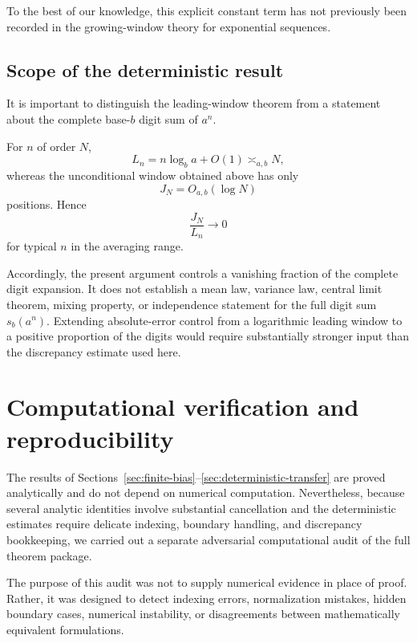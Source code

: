 \documentclass[11pt]{article}
\theoremstyle{definition}
\theoremstyle{remark}
\begin{document}
To the best of our knowledge, this explicit constant term has not
previously been recorded in the growing-window theory for exponential
sequences.


\subsection{Scope of the deterministic result}
\label{subsec:deterministic-scope}

It is important to distinguish the leading-window theorem from a
statement about the complete base-\(b\) digit sum of \(a^n\).

For \(n\) of order \(N\),
\[
    L_n
    =
    n\log_ba+O(1)
    \asymp_{a,b}N,
\]
whereas the unconditional window obtained above has only
\[
    J_N=O_{a,b}(\log N)
\]
positions.
Hence
\[
    \frac{J_N}{L_n}\longrightarrow0
\]
for typical \(n\) in the averaging range.

Accordingly, the present argument controls a vanishing fraction of the
complete digit expansion.  It does not establish a mean law, variance
law, central limit theorem, mixing property, or independence statement
for the full digit sum \(s_b(a^n)\).  Extending absolute-error control
from a logarithmic leading window to a positive proportion of the
digits would require substantially stronger input than the discrepancy
estimate used here.


\section{Computational verification and reproducibility}
\label{sec:verification}

The results of Sections~\ref{sec:finite-bias}--\ref{sec:deterministic-transfer}
are proved analytically and do not depend on numerical computation.
Nevertheless, because several analytic identities involve substantial
cancellation and the deterministic estimates require delicate
indexing, boundary handling, and discrepancy bookkeeping, we carried
out a separate adversarial computational audit of the full theorem
package.

The purpose of this audit was not to supply numerical evidence in place
of proof.  Rather, it was designed to detect indexing errors,
normalization mistakes, hidden boundary cases, numerical instability,
or disagreements between mathematically equivalent formulations.
\end{document}
